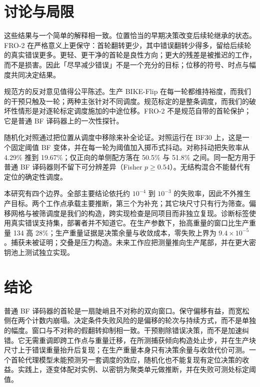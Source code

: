 \section{讨论与局限}\label{sec:discussion}

这些结果与一个简单的解释相一致。位置恰当的早期决策改变后续轮继承的状态。FRO-2 在严格意义上更保守：首轮翻转更少，其中错误翻转少得多，留给后续轮的真实错误更多。更轻、更干净的首轮是良性方向；更大的残差是被推迟的工作，而不是损害。因此「尽早减少错误」不是一个充分的目标；位移的符号、时点与幅度共同决定结果。

规范方的反对意见值得公平陈述。生产 BIKE-Flip 在每一轮都维持裕度，而我们的干预只触及一轮；两种主张针对不同调度。规范标定的是整条调度，而我们的破坏性情形是对逐轮标定调度施加的中途位移。FRO-2 不是规范自带的首轮保护；它是普通 BF 译码器上的一次性探针。

随机化对照通过把位置从调度中移除来补全论证。对照运行在 BF30 上，这是一个固定阈值 BF 变体，并在每一轮为阈值加入掷币式抖动。对称抖动把失败率从 4.29\% 推到 19.67\%；仅正向的单侧配方落在 50.5\% 与 51.8\% 之间。同一配方用于普通 BF 译码器则不留下可分辨差异（Fisher $p\ge0.54$）。无结构混合不能替代有定位的确定性调度。

本研究有四个边界。全部主要结论依托约 $10^{-4}$ 到 $10^{-3}$ 的失败率，因此不外推生产目标。两个工作点承载主要推断，第三个为补充；其它块尺寸只有行为筛查。偏移网格与被筛调度是我们的构造，跨实现检查是同项目而非独立复现。诊断标签使用真实错误支持集，部署者并不知道它。在生产参数下，抬高重量的窗口比生产重量 134 高 28\%；生产重量证据是决策余量与收敛成本，零失败上界为 $9.4\times10^{-5}$。捕获未被证明；交叠是压力构造。未来工作应把测量推向生产尾部，并在更大密钥池上测试独立实现。

\section{结论}\label{sec:conclusion}

普通 BF 译码器的首轮是一扇陡峭且不对称的双向窗口。保守偏移有益，而宽松侧在两个计数内崩塌。决定条件失败风险的是偏移的轮次与持续方式，而不是单独的幅度。窗口与不对称的假翻转抑制相一致。干预剔除错误决策，而不是加速纠错。它无需重调即跨工作点与重量迁移，在所测捕获倾向构造处止步，并在生产块尺寸上于错误重量抬升后复现；在生产重量本身只有决策余量与收敛代价可测。一个首轮代理模型未能预测另一套调度的效应，随机化也不能复现有定位决策的收益。实践上，逐变体配对实例、以密钥为聚类单元做推断，并在失败可测处标定阈值。
